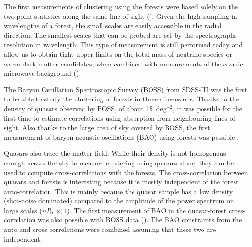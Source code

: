 The first measurements of clustering using the \lya forests 
were based solely on the two-point statistics along the same 
line of sight (\cite{croftPowerSpectrumMass1999, mcdonaldLyAlphaForest2006}). 
Given the high sampling in wavelengths of a forest, the small scales 
are easily accessible in the radial direction. 
The smallest scales that can be probed are set by the spectrographs resolution in wavelength.
This type of measurement is still performed today and allow us to obtain tight upper limits on 
the total mass of neutrino species or warm dark matter candidates, 
when combined with measurements of the cosmic microwave background
(\cite{palanque-delabrouilleHintsNeutrinoBounds2020}). 

The Baryon Oscillation Spectroscopic Survey (BOSS) from SDSS-III 
was the first to be able to study the clustering of \lya forests in three dimensions.
Thanks to the density of quasars observed by BOSS, of about 15~deg$^{-2}$, 
it was possible for the first time to estimate correlations using absorption 
from neighbouring lines of sight. Also thanks to the large area of sky covered by 
BOSS, the first measurement of baryon acoustic oscillations (BAO) using forests was possible 
\cite{buscaBaryonAcousticOscillations2013, 
slosarMeasurementBaryonAcoustic2013, 
kirkbyFittingMethodsBaryon2013}.

Quasars also trace the matter field. While their density is not homogenous enough across the sky 
to measure clustering using quasars alone, they can be used to compute cross-correlations with 
the forests. The cross-correlation between quasars and \lya forests is interesting 
because it is mostly independent of the \lya forest auto-correlation. 
This is mainly because the quasar sample has a low density (shot-noise dominated)
compared to the amplitude of the power spectrum on large scales ($\bar{n}P_0 \ll 1$).
The first measurement of BAO in the quasar-forest cross-correlation was also possible with 
BOSS data (\cite{font-riberaQuasarLymanAlphaForest2014}). 
The BAO constraints from the auto and cross correlations 
were combined assuming that these two are independent. 

